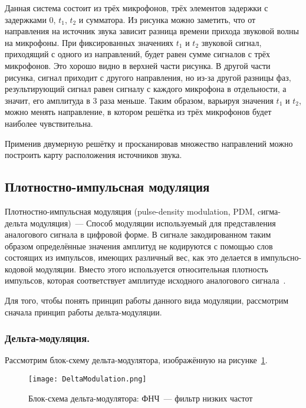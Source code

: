 Данная система состоит из трёх микрофонов, трёх элементов задержки с задержками $0$, $t_1$, $t_2$ и сумматора. Из рисунка можно заметить, что от направления на источник звука зависит разница времени прихода звуковой волны на микрофоны. При фиксированных значениях $t_1$ и $t_2$ звуковой сигнал, приходящий с одного из направлений, будет равен сумме сигналов с трёх микрофонов. Это хорошо видно в верхней части рисунка. В другой части рисунка, сигнал приходит с другого направления, но из-за другой разницы фаз, результирующий сигнал равен сигналу с каждого микрофона в отдельности, а значит, его амплитуда в 3 раза меньше. Таким образом, варьируя значения $t_1$ и $t_2$, можно менять направление, в котором решётка из трёх микрофонов будет наиболее чувствительна.

Применив двумерную решётку и просканировав множество направлений можно построить карту расположения источников звука.

\subsection{Плотностно-импульсная модуляция}
\label{section:pdm}
Плотностно-импульсная модуляция (\foreignlanguage{english}{pulse-density modulation, PDM}, cигма-дельта модуляция)~--- Способ модуляции используемый для представления аналогового сигнала в цифровой форме. В сигнале закодированном таким образом определённые значения амплитуд не кодируются с помощью слов состоящих из импульсов, имеющих различный вес, как это делается в импульсно-кодовой модуляции. Вместо этого используется относительная плотность импульсов, которая соответствует амплитуде исходного аналогового сигнала~\cite{Wiki_PDM}.

Для того, чтобы понять принцип работы данного вида модуляции, рассмотрим сначала принцип работы дельта-модуляции.

\subsubsection{Дельта-модуляция. }
Рассмотрим блок-схему дельта-модулятора, изображённую на рисунке~\ref{fig:DeltaModulation}.

\begin{figure}[ht]
	\centering
	\texttt{[image: DeltaModulation.png]}  
	\caption{Блок-схема дельта-модулятора: ФНЧ~--- фильтр низких частот}
	\label{fig:DeltaModulation}
\end{figure}


